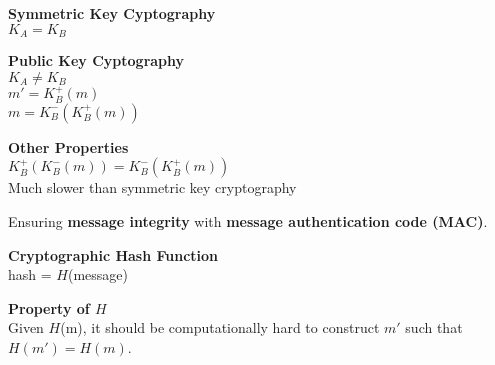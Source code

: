 \begin{cf}{
	\textbf{Symmetric Key Cyptography}\\
	$K_A = K_B$\\
	\vspace{1cm}
}
\end{cf}
\begin{cf}{
	\textbf{Public Key Cyptography}\\[20pt]

	$K_A \not = K_B$\\[20pt]
	$m' = K_B^+(m)$\\
	$m = K_B^-(K_B^+(m))$\\[20pt]

}
\end{cf}
\begin{cf}{
	\textbf{Other Properties}\\[20pt]

	$K_B^+(K_B^-(m)) = K_B^-(K_B^+(m))$\\[20pt]
	Much slower than symmetric key cryptography

}
\end{cf}
\begin{cf}{
}
\end{cf}
%
%
\begin{cf}{
	Ensuring \textbf{message integrity} with \textbf{message authentication code (MAC)}.
}
\end{cf}
\begin{cf}{
	\textbf{Cryptographic Hash Function}\\[20pt]
	hash = $H$(message)
}
\end{cf}
\begin{cf}{
	\textbf{Property of $H$}\\[20pt]
	Given $H$(m), it should be computationally hard to construct $m'$ such that $H(m') = H(m)$.
}
\end{cf}
